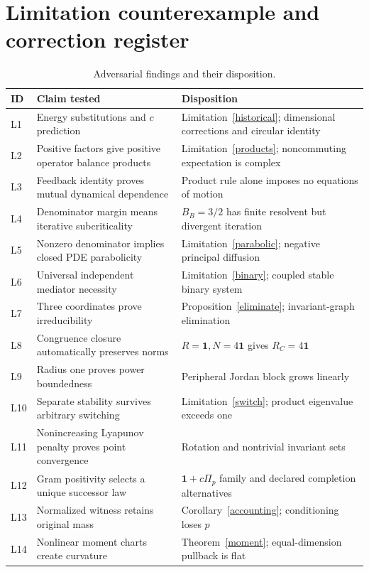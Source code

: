 \documentclass[11pt,letterpaper]{article}
\newcommand{\Id}{\mathbf 1}
\theoremstyle{definition}
\numberwithin{equation}{section}
\begin{document}
\section{Limitation counterexample and correction register}
\begin{longtable}{p{}p{}p{}}
\caption{Adversarial findings and their disposition.}\label{tab:limits}\\
\toprule ID & Claim tested & Disposition\\\midrule\endfirsthead
L1 & Energy substitutions and $c$ prediction & Limitation~\ref{historical}; dimensional corrections and circular identity\\
L2 & Positive factors give positive operator balance products & Limitation~\ref{products}; noncommuting expectation is complex\\
L3 & Feedback identity proves mutual dynamical dependence & Product rule alone imposes no equations of motion\\
L4 & Denominator margin means iterative subcriticality & $B_B=3/2$ has finite resolvent but divergent iteration\\
L5 & Nonzero denominator implies closed PDE parabolicity & Limitation~\ref{parabolic}; negative principal diffusion\\
L6 & Universal independent mediator necessity & Limitation~\ref{binary}; coupled stable binary system\\
L7 & Three coordinates prove irreducibility & Proposition~\ref{eliminate}; invariant-graph elimination\\
L8 & Congruence closure automatically preserves norms & $R=\Id,N=4\Id$ gives $R_C=4\Id$\\
L9 & Radius one proves power boundedness & Peripheral Jordan block grows linearly\\
L10 & Separate stability survives arbitrary switching & Limitation~\ref{switch}; product eigenvalue exceeds one\\
L11 & Nonincreasing Lyapunov penalty proves point convergence & Rotation and nontrivial invariant sets\\
L12 & Gram positivity selects a unique successor law & $\Id+c\Pi_p$ family and declared completion alternatives\\
L13 & Normalized witness retains original mass & Corollary~\ref{accounting}; conditioning loses $p$\\
L14 & Nonlinear moment charts create curvature & Theorem~\ref{moment}; equal-dimension pullback is flat\\

\end{longtable}
\end{document}
